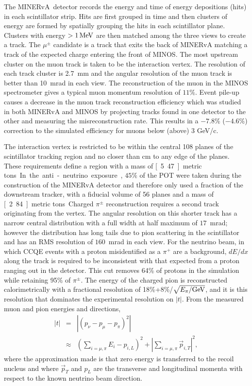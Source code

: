 \documentclass[aps,prl,twocolumn,showpacs,superscriptaddress,nofootinbib]{revtex4}
\newcommand{\minerva}{MINERvA\xspace}
\newcommand{\minos}{MINOS\xspace}
\newcommand{\tcoh}{\ensuremath{\left| t\right| \xspace}}
\newcommand{\rmt}{\rm\textstyle}
\begin{document}
The \minerva\ detector\cite{minerva_nim} 
 records the energy and time of energy
depositions (hits) in each scintillator strip.  Hits are first grouped
in time and then clusters of energy are formed by spatially grouping
the hits in each scintillator plane.  Clusters with energy
$>\unit[1]{MeV}$ are then matched among the three views to create a
track.  The  $\mu^\pm$ candidate is a track that exits
the back of \minerva matching a track of the expected charge entering the
front of \minos. The most upstream cluster on the muon track is taken to be the
interaction vertex.  The resolution of each track cluster is 2.7~mm and the
angular resolution of the muon track is better than
10~mrad
in each view.  The reconstruction of the muon in the MINOS spectrometer
gives a typical muon momentum resolution of $11\%$.  Event pile-up
causes a decrease in the muon track reconstruction efficiency which was studied in both \minerva and \minos by projecting tracks found in
one detector to the other and measuring the misreconstruction
rate. This results in a $-7.8$\% ($-4.6$\%) correction to the simulated
efficiency for muons below (above) 3 GeV/c.

The interaction vertex is restricted to be
within the central 108 planes of the scintillator tracking region and
no closer than \unit[22]{cm} to any edge of the planes. These
requirements define a region with a mass of \unit[5.47]{metric tons}.
In the anti-neutrino exposure, $45\%$ of the POT were taken during the construction of the \minerva detector and therefore only used a fraction of the downstream tracker, with a fiducial volume of 56 planes and a mass of \unit[2.84]{metric tons}.

Charged $\pi^\pm$ reconstruction requires a second track originating
from the vertex.  The angular resolution on this shorter
track has a narrow central distribution with a full width at half maximum of $17$~mrad;
however the distribution has long tails due to pion scattering in the
scintillator and has an RMS resolution of $160$~mrad in each view.  
For the neutrino beam, in which CCQE events with a proton misidentified as a $\pi^+$ are a background, $dE/dx$
along the track is required to be inconsistent with that expected from
a proton ranging out in the detector.  This cut removes 64\% of
protons in the simulation while retaining 95\% of $\pi^\pm$.  The
energy of the charged pion is reconstructed calorimetrically with a fractional resolution of 
18\%+8\%/$\sqrt{E_\pi/{\rmt GeV}}$, and it is this
resolution that dominates the experimental resolution
on \tcoh.  From the measured muon and pion energies and directions,
\begin{eqnarray}
\tcoh&=&\left| \left( p_{\nu}-p_{\mu}-p_{\pi}\right) ^2\right| \nonumber\\
&\approx&\left( \sum_{i=\mu,\pi} E_i-p_{i,L}\right)
^2+\left| \sum_{i=\mu,\pi}\vec{p}_{i,T}\right| ^2, 
\end{eqnarray} 
where the approximation made is that zero energy is transferred to the
recoil nucleus and where $\vec{p}_T$ and $p_L$ are the transverse and
longitudinal momenta with respect to the known neutrino beam direction.   
\end{document}
